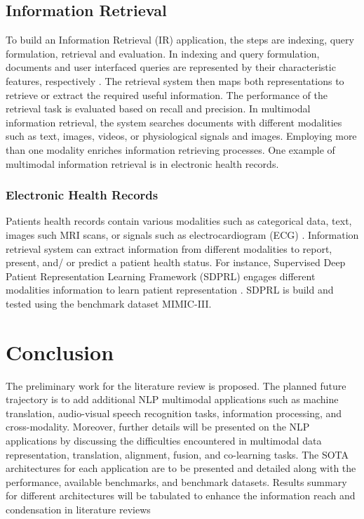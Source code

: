 \documentclass[conference]{IEEEtran}
\begin{document}
\subsection{Information Retrieval} 
To build an Information Retrieval (IR) application, the steps are indexing, query formulation, retrieval and evaluation. In indexing and query formulation, documents and user interfaced queries are represented by their characteristic features, respectively \cite{EHR}. The retrieval system then maps both representations to retrieve or extract the required useful information. The performance of the retrieval task is evaluated based on recall and precision. In multimodal information retrieval, the system searches documents with different modalities such as text, images, videos, or physiological signals and images. Employing more than one modality enriches information retrieving processes. One example of multimodal information retrieval is in electronic health records. 

\subsubsection{Electronic Health Records}
Patients health records contain various modalities such as categorical data, text, images such MRI scans, or signals such as electrocardiogram (ECG) \cite{EHR}. Information retrieval system can extract information from different modalities to report, present, and/ or predict a patient health status. For instance, Supervised Deep Patient Representation Learning Framework (SDPRL) engages different modalities information to learn patient representation \cite{zhang2021learning}. SDPRL is build and tested using the benchmark  dataset MIMIC-III. 



\section{Conclusion}

The preliminary work for the literature review is proposed. The planned future trajectory is to add additional NLP multimodal applications such as machine translation, audio-visual speech recognition tasks, information processing, and cross-modality. Moreover, further details will be presented on the NLP applications by discussing the difficulties encountered in multimodal data representation, translation, alignment, fusion, and co-learning tasks. The SOTA architectures for each application are to be presented and detailed along with the performance, available benchmarks, and benchmark datasets. Results summary for different architectures will be tabulated to enhance the information reach and condensation in literature reviews  

 
\end{document}
